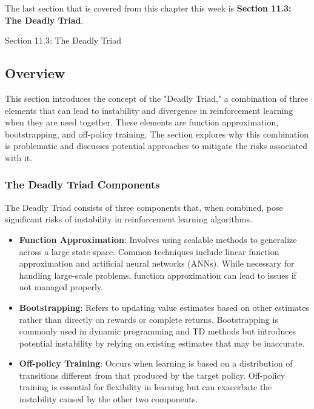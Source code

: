 The last section that is covered from this chapter this week is \textbf{Section 11.3: The Deadly Triad}.

\begin{notes}{Section 11.3: The Deadly Triad}
    \subsection*{Overview}

    This section introduces the concept of the "Deadly Triad," a combination of three elements that can lead to instability and divergence in reinforcement learning when they are used together. These elements 
    are function approximation, bootstrapping, and off-policy training. The section explores why this combination is problematic and discusses potential approaches to mitigate the risks associated with it.
    
    \subsubsection*{The Deadly Triad Components}
    
    The Deadly Triad consists of three components that, when combined, pose significant risks of instability in reinforcement learning algorithms.
    
    \begin{highlight}
    
        \begin{itemize}
            \item \textbf{Function Approximation}: Involves using scalable methods to generalize across a large state space. Common techniques include linear function approximation and artificial neural 
            networks (ANNs). While necessary for handling large-scale problems, function approximation can lead to issues if not managed properly.
            \item \textbf{Bootstrapping}: Refers to updating value estimates based on other estimates rather than directly on rewards or complete returns. Bootstrapping is commonly used in dynamic programming 
            and TD methods but introduces potential instability by relying on existing estimates that may be inaccurate.
            \item \textbf{Off-policy Training}: Occurs when learning is based on a distribution of transitions different from that produced by the target policy. Off-policy training is essential for flexibility 
            in learning but can exacerbate the instability caused by the other two components.
        \end{itemize}
    

\end{highlight}
\end{notes}
